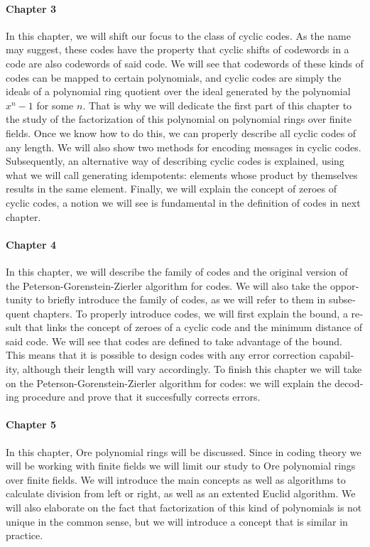 \begin{otherlanguage}{english}
\paragraph{Chapter 3} In this chapter, we will shift our focus to the class of cyclic codes. 
As the name may suggest, these codes have the property that cyclic shifts of codewords in a code are also codewords of said code.
We will see that codewords of these kinds of codes can be mapped to certain polynomials, and cyclic codes are simply the ideals of a polynomial ring quotient over the ideal generated by the polynomial \(x^n - 1\) for some \(n\).
That is why we will dedicate the first part of this chapter to the study of the factorization of this polynomial on polynomial rings over finite fields.
Once we know how to do this, we can properly describe all cyclic codes of any length.
We will also show two methods for encoding messages in cyclic codes.
Subsequently, an alternative way of describing cyclic codes is explained, using what we will call generating idempotents: elements whose product by themselves results in the same element.
Finally, we will explain the concept of zeroes of cyclic codes, a notion we will see is fundamental in the definition of  codes in next chapter.

\paragraph{Chapter 4} In this chapter, we will describe the family of  codes and the original version of the Peterson-Gorenstein-Zierler algorithm for  codes.
We will also take the opportunity to briefly introduce the family of  codes, as we will refer to them in subsequent chapters.
To properly introduce  codes, we will first explain the  bound, a result that links the concept of zeroes of a cyclic code and the minimum distance of said code.
We will see that  codes are defined to take advantage of the  bound.
This means that it is possible to design  codes with any error correction capability, although their length will vary accordingly.
To finish this chapter we will take on the Peterson-Gorenstein-Zierler algorithm for  codes: we will explain the decoding procedure and prove that it succesfully corrects errors.

\paragraph{Chapter 5} In this chapter, Ore polynomial rings will be discussed.
Since in coding theory we will be working with finite fields we will limit our study to Ore polynomial rings over finite fields.
We will introduce the main concepts as well as algorithms to calculate division from left or right, as well as an extented Euclid algorithm.
We will also elaborate on the fact that factorization of this kind of polynomials is not unique in the common sense, but we will introduce a concept that is similar in practice.


\end{otherlanguage}
